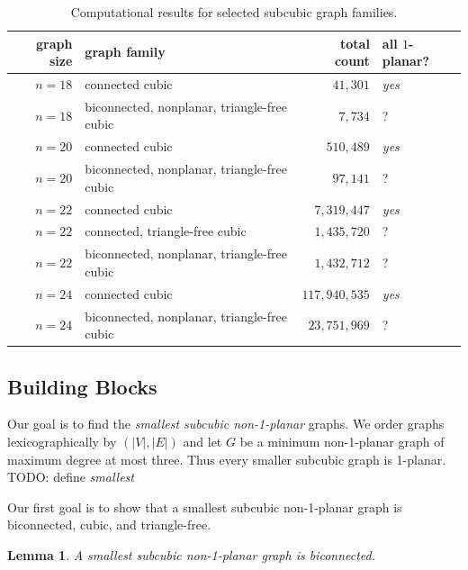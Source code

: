 \documentclass[a4paper,11pt]{article}
\theoremstyle{plain}
\newtheorem{lemma}{Lemma}
\theoremstyle{definition}  %
\newcommand{\df}[1]{\textcolor{defblue}{\emph{#1}}}
\newcommand{\yes}{{\it \textcolor{defgreen}{yes}}}
\begin{document}
\begin{table}[!t]
    \small
    \centering
    \caption{Computational results for selected subcubic graph families.}
    \label{table:subcubic}
    \begin{tabular}{@{}r p{205pt} r C{55pt}@{}}
        \toprule
        graph size & graph family & total count & all $1$-planar? \\
        \midrule
        $n=18$ & connected cubic                         & $41,\!301$ & \yes \\
        $n=18$ & biconnected, nonplanar, triangle-free cubic & $7,\!734$ & ? \\
        $n=20$ & connected cubic                         & $510,\!489$ & \yes \\
        $n=20$ & biconnected, nonplanar, triangle-free cubic & $97,\!141$ & ? \\
        $n=22$ & connected cubic                         & $7,\!319,\!447$ & \yes \\
        $n=22$ & connected, triangle-free cubic          & $1,\!435,\!720$ & ? \\
        $n=22$ & biconnected, nonplanar, triangle-free cubic & $1,\!432,\!712$ & ? \\
        $n=24$ & connected cubic                         & $117,\!940,\!535$ & \yes \\
        $n=24$ & biconnected, nonplanar, triangle-free cubic & $23,\!751,\!969$ & ? \\
        \bottomrule
    \end{tabular}
\end{table}

\subsection{Building Blocks}

Our goal is to find the \emph{smallest subcubic non-1-planar} graphs.  We order
graphs lexicographically by $(|V|,|E|)$ and let $G$ be a minimum non-1-planar
graph of maximum degree at most three.  Thus every smaller subcubic graph is
1-planar. TODO: define \df{smallest}

Our first goal is to show that a smallest subcubic non-1-planar graph is biconnected, cubic, and triangle-free.

\begin{lemma}
    \label{lm:bi}
    A smallest subcubic non-1-planar graph is biconnected.
\end{lemma}
\end{document}
